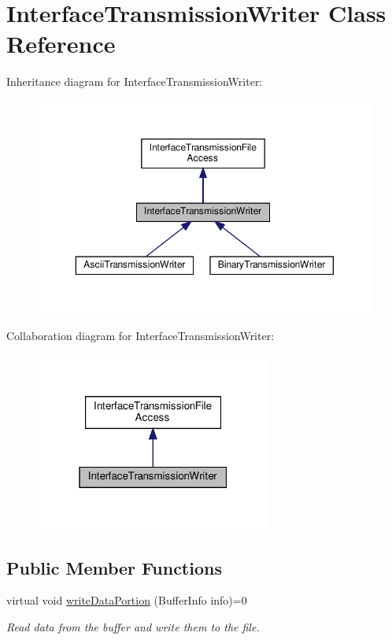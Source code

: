 \hypertarget{classInterfaceTransmissionWriter}{}\section{Interface\+Transmission\+Writer Class Reference}
\label{classInterfaceTransmissionWriter}


Inheritance diagram for Interface\+Transmission\+Writer\+:\nopagebreak
\begin{figure}[H]
\begin{center}
\leavevmode
\includegraphics[width=350pt]{de/d9f/classInterfaceTransmissionWriter__inherit__graph}
\end{center}
\end{figure}


Collaboration diagram for Interface\+Transmission\+Writer\+:\nopagebreak
\begin{figure}[H]
\begin{center}
\leavevmode
\includegraphics[width=220pt]{da/d88/classInterfaceTransmissionWriter__coll__graph}
\end{center}
\end{figure}
\subsection*{Public Member Functions}
\begin{DoxyCompactItemize}
\item 
virtual void \hyperlink{classInterfaceTransmissionWriter_a024c3a22d937e659259f2eb242b3ea97}{write\+Data\+Portion} (Buffer\+Info info)=0
\begin{DoxyCompactList}\small\item\em Read data from the buffer and write them to the file. \end{DoxyCompactList}\end{DoxyCompactItemize}
